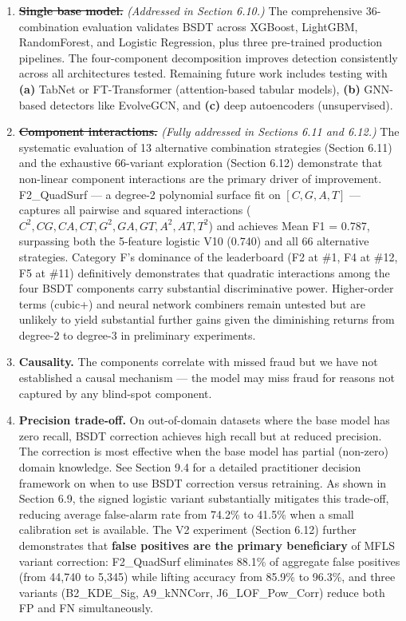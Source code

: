 \documentclass[
  11pt,
]{article}
\providecommand{\tightlist}{%
  \setlength{\itemsep}{0pt}\setlength{\parskip}{0pt}}
\begin{document}
\begin{enumerate}
\def\labelenumi{\arabic{enumi}.}
\tightlist
\item
  \textbf{\st{Single base model.}} \emph{(Addressed in Section 6.10.)}
  The comprehensive 36-combination evaluation validates BSDT across
  XGBoost, LightGBM, RandomForest, and Logistic Regression, plus three
  pre-trained production pipelines. The four-component decomposition
  improves detection consistently across all architectures tested.
  Remaining future work includes testing with \textbf{(a)} TabNet or
  FT-Transformer (attention-based tabular models), \textbf{(b)}
  GNN-based detectors like EvolveGCN, and \textbf{(c)} deep autoencoders
  (unsupervised).
\item
  \textbf{\st{Component interactions.}} \emph{(Fully addressed in
  Sections 6.11 and 6.12.)} The systematic evaluation of 13 alternative
  combination strategies (Section 6.11) and the exhaustive 66-variant
  exploration (Section 6.12) demonstrate that non-linear component
  interactions are the primary driver of improvement. F2\_QuadSurf — a
  degree-2 polynomial surface fit on \([C, G, A, T]\) — captures all
  pairwise and squared interactions
  (\(C^2, CG, CA, CT, G^2, GA, GT, A^2, AT, T^2\)) and achieves Mean F1
  = 0.787, surpassing both the 5-feature logistic V10 (0.740) and all 66
  alternative strategies. Category F’s dominance of the leaderboard (F2
  at \#1, F4 at \#12, F5 at \#11) definitively demonstrates that
  quadratic interactions among the four BSDT components carry
  substantial discriminative power. Higher-order terms (cubic+) and
  neural network combiners remain untested but are unlikely to yield
  substantial further gains given the diminishing returns from degree-2
  to degree-3 in preliminary experiments.
\item
  \textbf{Causality.} The components correlate with missed fraud but we
  have not established a causal mechanism — the model may miss fraud for
  reasons not captured by any blind-spot component.
\item
  \textbf{Precision trade-off.} On out-of-domain datasets where the base
  model has zero recall, BSDT correction achieves high recall but at
  reduced precision. The correction is most effective when the base
  model has partial (non-zero) domain knowledge. See Section 9.4 for a
  detailed practitioner decision framework on when to use BSDT
  correction versus retraining. As shown in Section 6.9, the signed
  logistic variant substantially mitigates this trade-off, reducing
  average false-alarm rate from 74.2\% to 41.5\% when a small
  calibration set is available. The V2 experiment (Section 6.12) further
  demonstrates that \textbf{false positives are the primary beneficiary}
  of MFLS variant correction: F2\_QuadSurf eliminates 88.1\% of
  aggregate false positives (from 44,740 to 5,345) while lifting
  accuracy from 85.9\% to 96.3\%, and three variants (B2\_KDE\_Sig,
  A9\_kNNCorr, J6\_LOF\_Pow\_Corr) reduce both FP and FN simultaneously.
\end{enumerate}
\end{document}
